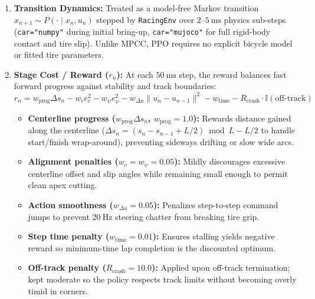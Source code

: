 \documentclass[11pt]{article}
\begin{document}
\begin{enumerate}[leftmargin=1.5em, itemsep=0.35em]
    \item \textbf{Transition Dynamics:} Treated as a model-free Markov transition $x_{n+1} \sim P(\cdot \mid x_n, u_n)$ stepped by \texttt{RacingEnv} over $2\text{--}5~\text{ms}$ physics sub-steps (\texttt{car="numpy"} during initial bring-up, \texttt{car="mujoco"} for full rigid-body contact and tire slip). Unlike MPCC, PPO requires no explicit bicycle model or fitted tire parameters.

    \item \textbf{Stage Cost / Reward ($r_n$):} At each $50~\text{ms}$ step, the reward balances fast forward progress against stability and track boundaries:
    \[
        r_n = w_{\text{prog}} \Delta s_n - w_c e_c^2 - w_\psi e_\psi^2 - w_{\Delta u} \|u_n - u_{n-1}\|^2 - w_{\text{time}} - R_{\text{crash}} \cdot \mathbb{I}(\text{off-track})
    \]
    \begin{itemize}[leftmargin=1.5em, itemsep=0.15em]
        \item \textbf{Centerline progress ($w_{\text{prog}} \Delta s_n$, $w_{\text{prog}} = 1.0$):} Rewards distance gained along the centerline ($\Delta s_n = (s_n - s_{n-1} + L/2) \bmod L - L/2$ to handle start/finish wrap-around), preventing sideways drifting or slow wide arcs.
        \item \textbf{Alignment penalties ($w_c = w_\psi = 0.05$):} Mildly discourages excessive centerline offset and slip angles while remaining small enough to permit clean apex cutting.
        \item \textbf{Action smoothness ($w_{\Delta u} = 0.05$):} Penalizes step-to-step command jumps to prevent $20~\text{Hz}$ steering chatter from breaking tire grip.
        \item \textbf{Step time penalty ($w_{\text{time}} = 0.01$):} Ensures stalling yields negative reward so minimum-time lap completion is the discounted optimum.
        \item \textbf{Off-track penalty ($R_{\text{crash}} = 10.0$):} Applied upon off-track termination; kept moderate so the policy respects track limits without becoming overly timid in corners.
    \end{itemize}


\end{enumerate}
\end{document}
